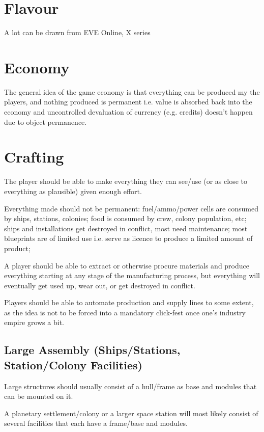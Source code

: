 \documentclass[a4paper,10pt]{article}
\begin{document}
\section{Flavour}
\begin{multicols}{2}
A lot can be drawn from EVE Online, X series

\end{multicols}

\section{Economy}
\begin{multicols}{2}
The general idea of the game economy is that everything can be produced my the
players, and nothing produced is permanent i.e. value is absorbed back into the
economy and uncontrolled devaluation of currency (e.g. credits) doesn't happen
due to object permanence.
\end{multicols}

\section{Crafting}
\begin{multicols}{2}
The player should be able to make everything they can see/use (or as close to
everything as plausible) given enough effort.

Everything made should not be permanent: fuel/ammo/power cells are consumed by
ships, stations, colonies; food is consumed by crew, colony population, etc;
ships and installations get destroyed in conflict, most need maintenance; most
blueprints are of limited use i.e. serve as licence to produce a limited amount
of product;

A player should be able to extract or otherwise procure materials and produce
everything starting at any stage of the manufacturing process, but everything
will eventually get used up, wear out, or get destroyed in conflict.

Players should be able to automate production and supply lines to some extent,
as the idea is not to be forced into a mandatory click-fest once one's industry
empire grows a bit.

\subsection{Large Assembly (Ships/Stations, Station/Colony Facilities)}
Large structures should usually consist of a hull/frame as base and modules
that can be mounted on it.

A planetary settlement/colony or a larger space station will most likely consist
of several facilities that each have a frame/base and modules.
\end{multicols}
\end{document}
